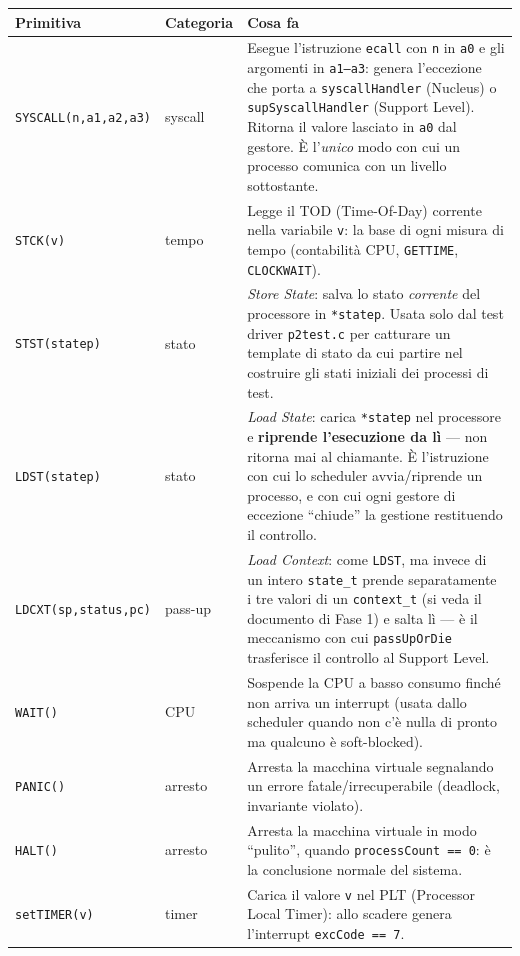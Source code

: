 \documentclass[11pt,a4paper]{article}
\newcommand{\code}[1]{\texttt{#1}}
\begin{document}
\begin{center}
\begin{longtable}{@{}llp{7.8cm}@{}}
\toprule
\textbf{Primitiva} & \textbf{Categoria} & \textbf{Cosa fa} \\
\midrule
\code{SYSCALL(n,a1,a2,a3)} & syscall & Esegue l'istruzione \code{ecall}
  con \code{n} in \code{a0} e gli argomenti in \code{a1--a3}: genera
  l'eccezione che porta a \code{syscallHandler} (Nucleus) o
  \code{supSyscallHandler} (Support Level). Ritorna il valore lasciato in
  \code{a0} dal gestore. \`E l'\emph{unico} modo con cui un processo
  comunica con un livello sottostante. \\
\code{STCK(v)} & tempo & Legge il TOD (Time-Of-Day) corrente nella
  variabile \code{v}: la base di ogni misura di tempo (contabilità CPU,
  \code{GETTIME}, \code{CLOCKWAIT}). \\
\code{STST(statep)} & stato & \emph{Store State}: salva lo stato
  \emph{corrente} del processore in \code{*statep}. Usata solo dal test
  driver \code{p2test.c} per catturare un template di stato da cui partire
  nel costruire gli stati iniziali dei processi di test. \\
\code{LDST(statep)} & stato & \emph{Load State}: carica \code{*statep} nel
  processore e \textbf{riprende l'esecuzione da lì} --- non ritorna mai al
  chiamante. \`E l'istruzione con cui lo scheduler avvia/riprende un
  processo, e con cui ogni gestore di eccezione ``chiude'' la gestione
  restituendo il controllo. \\
\code{LDCXT(sp,status,pc)} & pass-up & \emph{Load Context}: come
  \code{LDST}, ma invece di un intero \code{state\_t} prende separatamente
  i tre valori di un \code{context\_t} (si veda il documento di Fase 1) e
  salta lì --- è il meccanismo con cui \code{passUpOrDie} trasferisce il
  controllo al Support Level. \\
\code{WAIT()} & CPU & Sospende la CPU a basso consumo finché non arriva un
  interrupt (usata dallo scheduler quando non c'è nulla di pronto ma
  qualcuno è soft-blocked). \\
\code{PANIC()} & arresto & Arresta la macchina virtuale segnalando un
  errore fatale/irrecuperabile (deadlock, invariante violato). \\
\code{HALT()} & arresto & Arresta la macchina virtuale in modo
  ``pulito'', quando \code{processCount == 0}: è la conclusione normale
  del sistema. \\
\code{setTIMER(v)} & timer & Carica il valore \code{v} nel PLT (Processor
  Local Timer): allo scadere genera l'interrupt \code{excCode == 7}.

\end{longtable}
\end{center}
\end{document}
